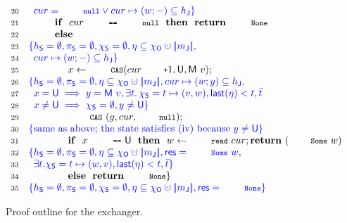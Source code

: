 {\begin{figure}
\[{{\begin{array}{rl}
\Num{20} & \specK{\hphantom{\}}cur = \esc{null} \vee cur \mapsto (w; -) \subseteq \heapj\}}\\
\Num{21} & ~~~~ ~~~~ \kw{if}~~cur~\esc{==}~\esc{null}~~\kw{then}~~\kw{return}~{\esc{None}}\\
\Num{22} & ~~~~ ~~~~ \kw{else}\\
\Num{23} & \specK{\{\heaps = \emptyset, \perms = \emptyset, \hists = \emptyset, \gist \subseteq \histo \hunion \mygather{\pending},}\\
\Num{24} & \specK{\hphantom{\}} cur \mapsto (w; -) \subseteq \heapj\}}\\
\Num{25} & ~~~~ ~~~~ ~~~~ x \Asgn \esc{CAS}(cur\esc{+}1, \Unmatched, \Matched v);\\
\Num{26} & \specK{\{\heaps = \emptyset, \perms = \emptyset, \gist \subseteq \histo \hunion \mygather{\pending}, cur \mapsto (w; y) \subseteq \heapj,} \\
\Num{27} & \specK{\hphantom{\}}x = \Unmatched \implies y = \Matched v, \exists t\ldot \hists = t \mapsto (v, w), \mathsf{last}(\gist) < t, \twin t}\\
\Num{28} & \specK{\hphantom{\}}x \neq \Unmatched \implies \hists = \emptyset, y \neq \Unmatched \}}\\
\Num{29} & ~~~~ ~~~~ ~~~~ \esc{CAS}~(g, cur, \esc{null});\\
\Num{30} & \specK{\{\mbox{same as above; the state satisfies (iv) because $y \neq \Unmatched$}\}}\\
\Num{31} & ~~~~ ~~~~ ~~~~ \kw{if}~~x~\esc{==}~\Unmatched~~\kw{then}~~w\Asgn \esc{read}~cur;\kw{return}~(\esc{Some}\ w)\\
\Num{32} & \specK{\{ \heaps = \emptyset, \perms = \emptyset, \gist \subseteq \histo \hunion \mygather{\pending}, \res=\esc{Some}\ w}, \\
\Num{33} & \specK{\hphantom{\}}\exists t. \hists = t \mapsto (w, v), \mathsf{last}(\gist) < t, \twin t\}}\\
\Num{34} & ~~~~ ~~~~ ~~~~ \kw{else}~~\kw{return}~\esc{None}\}\\
\Num{35} & \specK{\{\heaps = \emptyset, \perms = \emptyset, \hists = \emptyset, \gist \subseteq \histo \hunion \mygather{\pending}, \res=\esc{None}\}} 
\end{array}
}}
\]
\caption{Proof outline for the exchanger.}
\label{fig:exchanger_proof}
\end{figure} 
}

